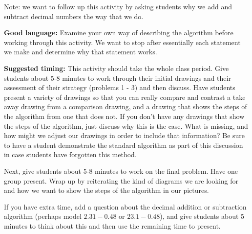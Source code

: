 \documentclass[nooutcomes,noauthor]{ximera}
\begin{document}
\begin{instructorNotes}
Note: we want to follow up this activity by asking students why we add and subtract decimal numbers the way that we do.


{\bf Good language:}  Examine your own way of describing the algorithm before working through this activity. We want to stop after essentially each statement we make and determine why that statement works.


{\bf Suggested timing:} This activity should take the whole class period. Give students about 5-8 minutes to work through their initial drawings and their assessment of their strategy (problems 1 - 3) and then discuss. Have students present a variety of drawings so that you can really compare and contrast a take away drawing from a comparison drawing, and a drawing that shows the steps of the algorithm from one that does not. If you don't have any drawings that show the steps of the algorithm, just discuss why this is the case. What is missing, and how might we adjust our drawings in order to include that information? Be sure to have a student demonstrate the standard algorithm as part of this discussion in case students have forgotten this method.

Next, give students about 5-8 minutes to work on the final problem. Have one group present. Wrap up by reiterating the kind of diagrams we are looking for and how we want to show the steps of the algorithm in our pictures.


If you have extra time, add a question about the decimal addition or subtraction algorithm (perhaps model $2.31 - 0.48$ or $23.1 - 0.48$), and give students about 5 minutes to think about this and then use the remaining time to present.


\end{instructorNotes}
\end{document}
